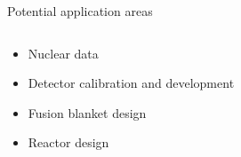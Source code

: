 \documentclass[xcolor=x11names,compress]{beamer}
\renewcommand{\(}{\begin{columns}}
\renewcommand{\)}{\end{columns}}
\newcommand{\<}[1]{\begin{column}{#1}}
\renewcommand{\>}{\end{column}}
\begin{document}
\begin{frame}{Potential application areas}
\begin{columns}
    \begin{column}{0.5\linewidth}
      \begin{itemize}
        \item Nuclear data
        \item Detector calibration and development
        \item Fusion blanket design
        \item Reactor design
      \end{itemize}
      \renewcommand*{\thesubfigure}{}
      \vspace{-0.5cm}
      \begin{figure}[htp]
        \centering
        \subcapcentertrue
      \end{figure}
    \end{column}
    
  \end{columns}
\end{frame}
\end{document}
